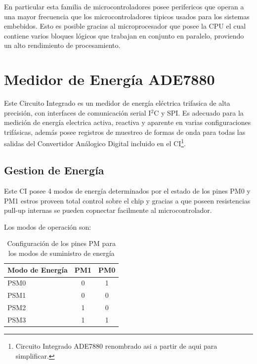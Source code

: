 \documentclass[letterpaper,12pt,oneside]{book}
\begin{document}
		En particular esta familia de microcontroladores posee perifericos que operan a una mayor frecuencia que los microcontroladores tipicos usados para los sistemas embebidos. Esto es posible gracias al microprocesador que posee la CPU el cual contiene varios bloques lógicos que trabajan en conjunto en paralelo, proviendo un alto rendimiento de procesamiento.

		\section{Medidor de Energía ADE7880}
		Este Circuito Integrado es un medidor de energía eléctrica trifasica de alta precisión, con interfaces de comunicación serial I$^2$C y SPI. Es adecuado para la medición de energía electrica activa, reactiva y aparente en varias configuraciones trifásicas, además posee registros de muestreo de formas de onda para todas las salidas del Convertidor Análogico Digital incluido en el CI\footnote{Circuito Integrado ADE7880 renombrado asi a partir de aqui para simplificar.}.

			\subsection{Gestion de Energía}
			Este CI posee 4 modos de energía determinados por el estado de los pines PM0 y PM1 estros proveen total control sobre el chip y gracias a que poseen resistencias pull-up internas se pueden copnectar facilmente al microcontrolador.

			Los modos de operación son:

			\begin{table}[!htpb]
				\centering
				\begin{tabular}{ l | c | c}
					\textbf{Modo de Energía} & \textbf{PM1} & \textbf{PM0}\\
					\hline
					PSM0 & 0 & 1 \\
					PSM1 & 0 & 0 \\
					PSM2 & 1 & 0 \\
					PSM3 & 1 & 1 \\
				\end{tabular}
				\caption[Modos de Suministro de Energía]{Configuración de los pines PM para los modos de suministro de energía}
			\end{table}
\end{document}
